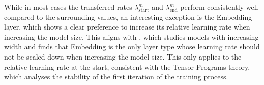 \documentclass{article}
\theoremstyle{plain}
\theoremstyle{definition}
\theoremstyle{remark}
\newcommand{\roundto}[2]{%
        \FPsub\tempresult{#1}{1}%
        \FPmul\tempresult{\tempresult}{100}%
        \FPround\result{\tempresult}{1}%
        \result\%
    }
\newcommand{\sj}[1]{\textcolor{blue}{[SJ: #1]}}
\newcommand{\jl}[1]{\textcolor{green}{[JL: #1]}}
\newcommand{\jmr}[2]{\textcolor{purple}{[JM:] \sout{#1} #2}}
\begin{document}
    While in most cases the transferred rates $\lambda_{\text{start}}^m$ and $\lambda_{\text{end}}^m$ perform consistently well compared to the surrounding values, an interesting exception is the Embedding layer, which shows a clear preference to increase its relative learning rate when increasing the model size. This aligns with \citet{yang2022tensor}, which studies models with increasing width and finds that Embedding is the only layer type whose learning rate should not be scaled down when increasing the model size. This only applies to the relative learning rate at the start, consistent with the Tensor Programs theory, which analyses the stability of the first iteration of the training process. 
    
    
    
    
    
    
    
    
    
\end{document}

